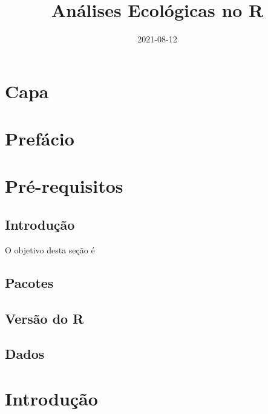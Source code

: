 \documentclass[
]{article}
\title{Análises Ecológicas no R}
\author{}
\date{\vspace{-2.5em}2021-08-12}
\begin{document}
\maketitle

{
\setcounter{tocdepth}{2}
\tableofcontents
}
\hypertarget{capa}{%
\section*{Capa}\label{capa}}

\newpage

\hypertarget{prefuxe1cio}{%
\section*{Prefácio}\label{prefuxe1cio}}

\newpage

\hypertarget{base-r}{%
\section{Pré-requisitos}\label{base-r}}

\hypertarget{introduuxe7uxe3o}{%
\subsection{Introdução}\label{introduuxe7uxe3o}}

O objetivo desta seção é

\hypertarget{pacotes}{%
\subsection{Pacotes}\label{pacotes}}

\hypertarget{versuxe3o-do-r}{%
\subsection{Versão do R}\label{versuxe3o-do-r}}

\hypertarget{dados}{%
\subsection{Dados}\label{dados}}

\hypertarget{cap2}{%
\section{Introdução}\label{cap2}}
\end{document}
